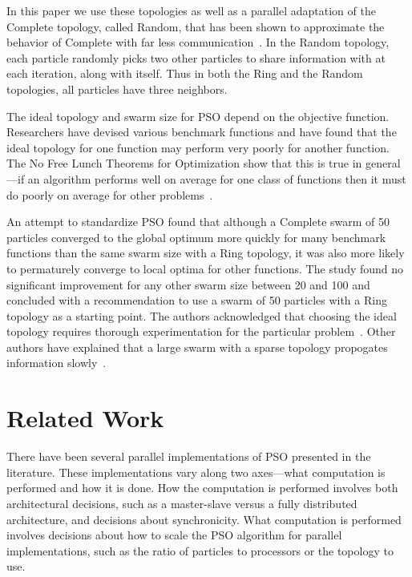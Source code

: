 \documentclass[ms]{byuprop}
\begin{document}
In this paper we use these topologies as well as a parallel adaptation of the
Complete topology, called Random, that has been shown to approximate the
behavior of Complete with far less
communication~\citep{mcnabb-2009-large-particle-swarms}.  In the Random
topology, each particle randomly picks two other particles to share information
with at each iteration, along with itself.  Thus in both the Ring and the
Random topologies, all particles have three neighbors.

The ideal topology and swarm size for PSO depend on the objective function.
Researchers have devised various benchmark functions and have found that the
ideal topology for one function may perform very poorly for another function.
The No Free Lunch Theorems for Optimization show that this is true in
general---if an algorithm performs well on average for one class of functions
then it must do poorly on average for other
problems~\citep{wolpert-1997-nfl-for-optimization}.

An attempt to standardize PSO found that although a Complete swarm of 50
particles converged to the global optimum more quickly for many benchmark
functions than the same swarm size with a Ring topology, it was also more
likely to permaturely converge to local optima for other functions.  The study
found no significant improvement for any other swarm size between 20 and 100
and concluded with a recommendation to use a swarm of 50 particles with a Ring
topology as a starting point.  The authors acknowledged that choosing the ideal
topology requires thorough experimentation for the particular
problem~\citep{bratton-2007-defining-a-standard-for-pso}.  Other authors have
explained that a large swarm with a sparse topology propogates information
slowly~\citep{montes-de-oca-2009-frankensteins-pso}.



\section{Related Work}

There have been several parallel implementations of PSO presented in the
literature.  These implementations vary along two axes---what computation is
performed and how it is done.  How the computation is performed involves both
architectural decisions, such as a master-slave versus a fully distributed
architecture, and decisions about synchronicity.  What computation is performed
involves decisions about how to scale the PSO algorithm for parallel
implementations, such as the ratio of particles to processors or the topology
to use.
\end{document}

